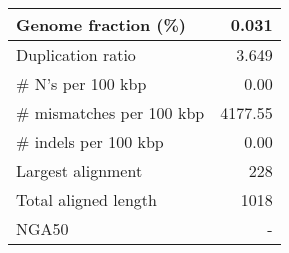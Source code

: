 \documentclass[12pt,a4paper]{article}
\begin{document}
\begin{table}[ht]
\begin{center}
\begin{tabular}{|l*{1}{|r}|}
Genome fraction (\%) & 0.031 \\ \hline
Duplication ratio & 3.649 \\ \hline
\# N's per 100 kbp & 0.00 \\ \hline
\# mismatches per 100 kbp & 4177.55 \\ \hline
\# indels per 100 kbp & 0.00 \\ \hline
Largest alignment & 228 \\ \hline
Total aligned length & 1018 \\ \hline
NGA50 & - \\ \hline
\end{tabular}
\end{center}
\end{table}
\end{document}
